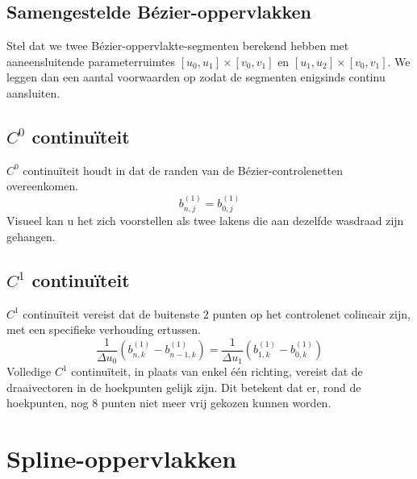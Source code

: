 \documentclass[computergesteund_ontwerp_van_curven_en_oppervlakken.tex]{subfiles}
\begin{document}
\subsection{Samengestelde B\'ezier-oppervlakken}
Stel dat we twee B\'ezier-oppervlakte-segmenten berekend hebben met aaneensluitende parameterruimtes $[u_0,u_1]\times[v_0,v_1]$ en $[u_1,u_2]\times[v_0,v_1]$. We leggen dan een aantal voorwaarden op zodat de segmenten enigsinds continu aansluiten.

\subsection*{$C^{0}$ continu\"iteit}
$C^{0}$ continu\"iteit houdt in dat de randen van de B\'ezier-controlenetten overeenkomen.
\[
b_{n,j}^{(1)} = b_{0,j}^{(1)}
\]
Visueel kan u het zich voorstellen als twee lakens die aan dezelfde wasdraad zijn gehangen.

\subsection*{$C^{1}$ continu\"iteit}
$C^{1}$ continu\"iteit vereist dat de buitenste $2$ punten op het controlenet colineair zijn, met een specifieke verhouding ertussen.
\[
\frac{1}{\Delta u_0}(b_{n,k}^{(1)}-b_{n-1,k}^{(1)}) = \frac{1}{\Delta u_1}(b_{1,k}^{(1)}-b_{0,k}^{(1)})
\]
Volledige $C^{1}$ continu\"iteit, in plaats van enkel \'e\'en richting, vereist dat de draaivectoren in de hoekpunten gelijk zijn. Dit betekent dat er, rond de hoekpunten, nog $8$ punten niet meer vrij gekozen kunnen worden.

\section{Spline-oppervlakken}
\end{document}
